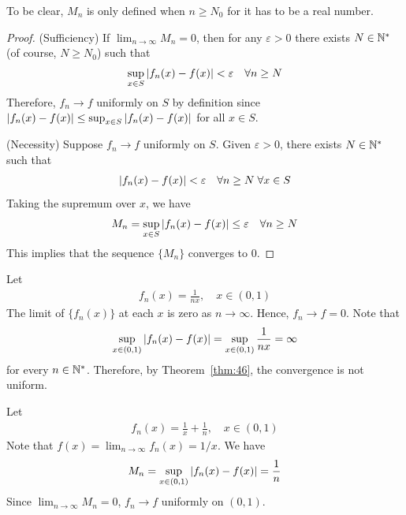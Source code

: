 \documentclass[thmcnt=section, 12pt]{my-elegantbook}
\begin{document}
\begin{note}
    To be clear, $M_n$ is only defined when $n \geq N_0$ for it has to be a real number.
\end{note}

\begin{proof}
    (Sufficiency) If $\lim_{n \to \infty} M_n = 0$, then for any $\varepsilon > 0$ there exists $N \in \mathbb{N}^\ast$ (of course, $N \geq N_0$) such that 
    \begin{align*}
        \sup_{x \in S} \left\lvert f_n(x) - f(x) \right\rvert < \varepsilon
        \quad \forall n \geq N
    \end{align*}
    Therefore, $f_n \to f$ uniformly on $S$ by definition since $\left\lvert f_n(x) - f(x) \right\rvert \leq \sup_{x \in S} \left\lvert f_n(x) - f(x) \right\rvert$ for all $x \in S$.

    (Necessity) Suppose $f_n \to f$ uniformly on $S$. Given $\varepsilon > 0$, there exists $N \in \mathbb{N}^\ast$ such that 
    \begin{align*}
        \left\lvert f_n(x) - f(x) \right\rvert < \varepsilon
        \quad \forall n \geq N \; 
        \forall x \in S
    \end{align*}
    Taking the supremum over $x$, we have 
    \begin{align*}
        M_n
        = \sup_{x \in S} \left\lvert f_n(x) - f(x) \right\rvert \leq \varepsilon
        \quad \forall n \geq N
    \end{align*}
    This implies that the sequence $\{M_n\}$ converges to $0$.
\end{proof}

\begin{example}
    Let
    \begin{align*}
        f_n(x) = \frac{1}{nx},
        \quad x \in (0, 1)
    \end{align*}
    The limit of $\{f_n(x)\}$ at each $x$ is zero as $n \to \infty$. Hence, $f_n \to f = 0$. Note that 
    \begin{align*}
        \sup_{x \in (0, 1)} \left\lvert f_n(x) - f(x) \right\rvert
        = \sup_{x \in (0, 1)} \frac{1}{nx}
        = \infty
    \end{align*}
    for every $n \in \mathbb{N}^\ast$. Therefore, by Theorem~\ref{thm:46}, the convergence is not uniform.
\end{example}

\begin{example}
    Let 
    \begin{align*}
        f_n(x) = \frac{1}{x} + \frac{1}{n},
        \quad x \in (0, 1)
    \end{align*}
    Note that $f(x) = \lim_{n \to \infty} f_n(x) = 1 / x$. We have
    \begin{align*}
        M_n = \sup_{x \in (0, 1)} \left\lvert f_n(x) - f(x) \right\rvert
        = \frac{1}{n}
    \end{align*}
    Since $\lim_{n \to \infty} M_n = 0$, $f_n \to f$ uniformly on $(0, 1)$.
\end{example}
\end{document}
